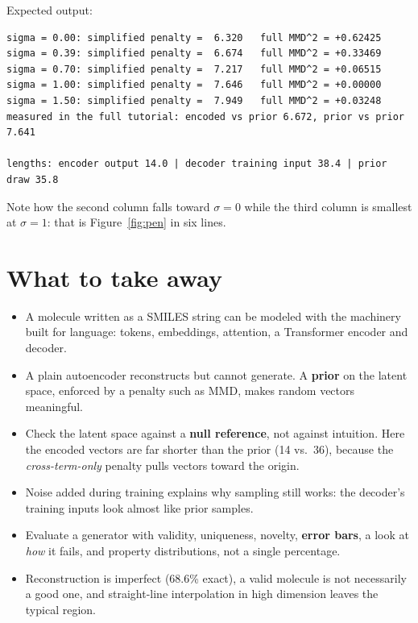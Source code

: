 \documentclass[11pt]{article}
\begin{document}
Expected output:
\begin{lstlisting}[language={},basicstyle=\ttfamily\small]
sigma = 0.00: simplified penalty =  6.320   full MMD^2 = +0.62425
sigma = 0.39: simplified penalty =  6.674   full MMD^2 = +0.33469
sigma = 0.70: simplified penalty =  7.217   full MMD^2 = +0.06515
sigma = 1.00: simplified penalty =  7.646   full MMD^2 = +0.00000
sigma = 1.50: simplified penalty =  7.949   full MMD^2 = +0.03248
measured in the full tutorial: encoded vs prior 6.672, prior vs prior 7.641

lengths: encoder output 14.0 | decoder training input 38.4 | prior draw 35.8
\end{lstlisting}

Note how the second column falls toward $\sigma=0$ while the third column is smallest at $\sigma=1$: that is Figure~\ref{fig:pen} in six lines.

\section{What to take away}
\begin{keybox}[Summary]
\begin{itemize}[nosep]
  \item A molecule written as a SMILES string can be modeled with the machinery built for language: tokens, embeddings, attention, a Transformer encoder and decoder.
  \item A plain autoencoder reconstructs but cannot generate. A \textbf{prior} on the latent space, enforced by a penalty such as MMD, makes random vectors meaningful.
  \item Check the latent space against a \textbf{null reference}, not against intuition. Here the encoded vectors are far shorter than the prior (14 vs.\ 36), because the \emph{cross-term-only} penalty pulls vectors toward the origin.
  \item Noise added during training explains why sampling still works: the decoder's training inputs look almost like prior samples.
  \item Evaluate a generator with validity, uniqueness, novelty, \textbf{error bars}, a look at \emph{how} it fails, and property distributions, not a single percentage.
  \item Reconstruction is imperfect (68.6\% exact), a valid molecule is not necessarily a good one, and straight-line interpolation in high dimension leaves the typical region.
\end{itemize}
\end{keybox}
\end{document}
